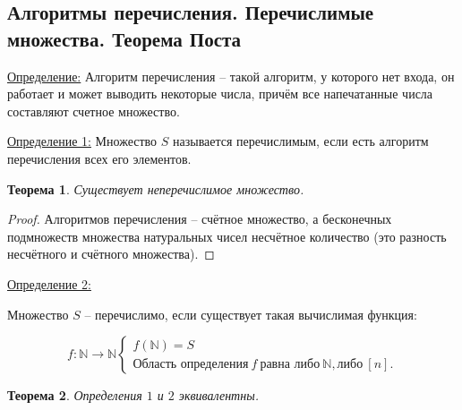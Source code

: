 \documentclass[a4paper, 12pt]{article}
\newtheorem*{theorem}{Теорема}
\newcommand{\definition}{\underline{Определение:} }
\newcommand{\definitionone}{\underline{Определение 1:} }
\newcommand{\definitiontwo}{\underline{Определение 2:} }
\newcommand{\N}{\mathbb{N}}
\begin{document}
\subsection*{Алгоритмы перечисления. Перечислимые множества. Теорема Поста}


\definition{Алгоритм перечисления -- такой алгоритм, у которого нет входа, он работает и может выводить некоторые числа, причём все напечатанные числа составляют счетное множество.}

\definitionone{Множество $S$ называется перечислимым, если есть алгоритм перечисления всех его элементов.}

\begin{theorem}

Существует неперечислимое множество.

\end{theorem}

\begin{proof}

Алгоритмов перечисления -- счётное множество, а бесконечных подмножеств множества натуральных чисел несчётное количество (это разность несчётного и счётного множества).

\end{proof}

\definitiontwo{Множество $S$ -- перечислимо, если существует такая вычислимая функция:

\[
    f: \N \to \N
    \begin{cases}
        f(\N) = S \\
        \text{Область определения} \ f \ \text{равна либо} \ \N, \text{либо} \ [n].
    \end{cases}
\]

}

\begin{theorem}

Определения $1$ и $2$ эквивалентны.

\end{theorem}
\end{document}
